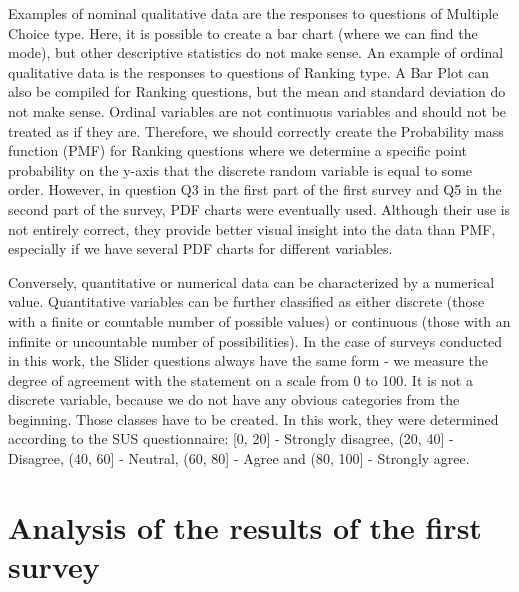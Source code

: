 \documentclass[a4paper,10pt,twoside]{article}
\begin{document}
Examples of nominal qualitative data are the responses to questions of Multiple Choice type. Here, it is possible to create a bar chart (where we can find the mode), but other descriptive statistics do not make sense. An example of ordinal qualitative data is the responses to questions of Ranking type. A Bar Plot can also be compiled for Ranking questions, but the mean and standard deviation do not make sense. Ordinal variables are not continuous variables and should not be treated as if they are. Therefore, we should correctly create the Probability mass function (PMF) for Ranking questions where we determine a specific point probability on the y-axis that the discrete random variable is equal to some order. However, in question Q3 in the first part of the first survey and Q5 in the second part of the survey, PDF charts were eventually used. Although their use is not entirely correct, they provide better visual insight into the data than PMF, especially if we have several PDF charts for different variables.

Conversely, quantitative or numerical data can be characterized by a numerical value. Quantitative variables can be further classified as either discrete (those with a finite or countable number of possible values) or continuous (those with an infinite or uncountable number of possibilities). In the case of surveys conducted in this work, the Slider questions always have the same form - we measure the degree of agreement with the statement on a scale from 0 to 100. It is not a discrete variable, because we do not have any obvious categories from the beginning. Those classes have to be created. In this work, they were determined according to the SUS questionnaire: [0, 20] - Strongly disagree, (20, 40] - Disagree, (40, 60] - Neutral, (60, 80] - Agree and (80, 100] - Strongly agree.




\newpage
\vspace*{-1cm}
\section{Analysis of the results of the first survey}
\label{sec:qstat}
\end{document}
